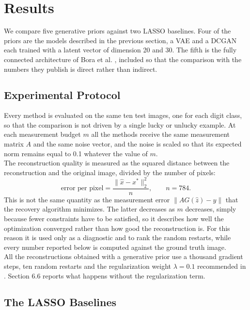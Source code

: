 \section{Results}
\vspace{1cm}
We compare five generative priors against two LASSO baselines. Four of the priors are the models described in the previous section, a VAE and a DCGAN each trained with a latent vector of dimension 20 and 30. The fifth is the fully connected architecture of Bora et al. \cite{bora2017}, included so that the comparison with the numbers they publish is direct rather than indirect.

\subsection{Experimental Protocol}

Every method is evaluated on the same ten test images, one for each digit class, so that the comparison is not driven by a single lucky or unlucky example. At each measurement budget \( m \) all the methods receive the same measurement matrix \( A \) and the same noise vector, and the noise is scaled so that its expected norm remains equal to 0.1 whatever the value of \( m \).
\\
The reconstruction quality is measured as the squared distance between the reconstruction and the original image, divided by the number of pixels:
\begin{equation}
\text{error per pixel} = \frac{\lVert \hat{x} - x^* \rVert_2^2}{n}, \qquad n = 784 .
\end{equation}
This is not the same quantity as the measurement error \( \lVert AG(\hat{z}) - y \rVert \) that the recovery algorithm minimizes. The latter decreases as \( m \) decreases, simply because fewer constraints have to be satisfied, so it describes how well the optimization converged rather than how good the reconstruction is. For this reason it is used only as a diagnostic and to rank the random restarts, while every number reported below is computed against the ground truth image.
\\
All the reconstructions obtained with a generative prior use a thousand gradient steps, ten random restarts and the regularization weight \( \lambda = 0.1 \) recommended in \cite{bora2017}. Section 6.6 reports what happens without the regularization term.

\subsection{The LASSO Baselines}

